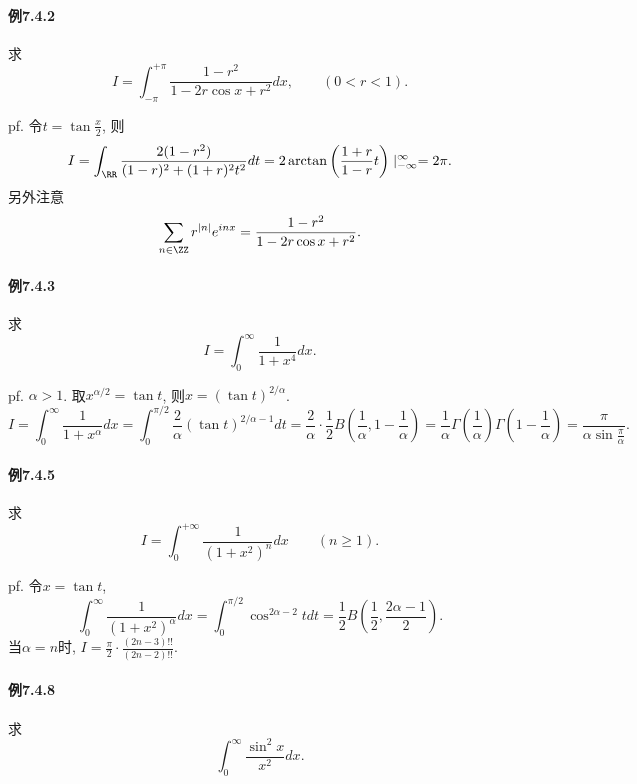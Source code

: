 \paragraph{例7.4.2}

求
\[
I=\int_{-\pi}^{+\pi}\frac{1-r^{2}}{1-2r\cos x+r^{2}}dx,\qquad(0<r<1).
\]

pf. 令$t=\tan\frac{x}{2}$, 则
\[
I=\int_{\RR}\frac{2(1-r^{2})}{(1-r)^{2}+(1+r)^{2}t^{2}}dt=2\arctan\left(\frac{1+r}{1-r}t\right)\mid_{-\infty}^{\infty}=2\pi.
\]
另外注意
\[
\sum_{n\in\ZZ}r^{\left|n\right|}e^{inx}=\frac{1-r^{2}}{1-2r\cos x+r^{2}}.
\]


\paragraph{例7.4.3}

求
\[
I=\int_{0}^{\infty}\frac{1}{1+x^{4}}dx.
\]

pf. $\alpha>1$. 取$x^{\alpha/2}=\tan t$, 则$x=\left(\tan t\right)^{2/\alpha}$.
\[
I=\int_{0}^{\infty}\frac{1}{1+x^{\alpha}}dx=\int_{0}^{\pi/2}\frac{2}{\alpha}\left(\tan t\right)^{2/\alpha-1}dt=\frac{2}{\alpha}\cdot\frac{1}{2}B\left(\frac{1}{\alpha},1-\frac{1}{\alpha}\right)=\frac{1}{\alpha}\Gamma\left(\frac{1}{\alpha}\right)\Gamma\left(1-\frac{1}{\alpha}\right)=\frac{\pi}{\alpha\sin\frac{\pi}{\alpha}}.
\]


\paragraph{例7.4.5}

求
\[
I=\int_{0}^{+\infty}\frac{1}{\left(1+x^{2}\right)^{n}}dx\qquad(n\geqslant1).
\]

pf. 令$x=\tan t$, 
\[
\int_{0}^{\infty}\frac{1}{(1+x^{2})^{\alpha}}dx=\int_{0}^{\pi/2}\cos^{2\alpha-2}tdt=\frac{1}{2}B\left(\frac{1}{2},\frac{2\alpha-1}{2}\right).
\]
当$\alpha=n$时, $I=\frac{\pi}{2}\cdot\frac{(2n-3)!!}{(2n-2)!!}$.

\paragraph{例7.4.8}

求
\[
\int_{0}^{\infty}\frac{\sin^{2}x}{x^{2}}dx.
\]

